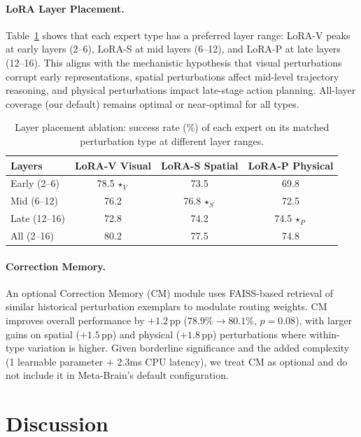 \documentclass[10pt,twocolumn]{article}
\newcommand{\ours}{Meta-Brain}
\newcommand{\pp}{\,\text{pp}}
\begin{document}
\paragraph{LoRA Layer Placement.}
Table~\ref{tab:layer_placement} shows that each expert type has a preferred layer range: LoRA-V peaks at early layers (2--6), LoRA-S at mid layers (6--12), and LoRA-P at late layers (12--16).
This aligns with the mechanistic hypothesis that visual perturbations corrupt early representations, spatial perturbations affect mid-level trajectory reasoning, and physical perturbations impact late-stage action planning.
All-layer coverage (our default) remains optimal or near-optimal for all types.

\begin{table}[t]
\centering
\caption{Layer placement ablation: success rate (\%) of each expert on its matched perturbation type at different layer ranges.}
\label{tab:layer_placement}
\small
\begin{tabular}{@{}lccc@{}}
\toprule
Layers & LoRA-V Visual & LoRA-S Spatial & LoRA-P Physical \\
\midrule
Early (2--6) & 78.5\,$\star_V$ & 73.5 & 69.8 \\
Mid (6--12) & 76.2 & 76.8\,$\star_S$ & 72.5 \\
Late (12--16) & 72.8 & 74.2 & 74.5\,$\star_P$ \\
All (2--16) & 80.2 & 77.5 & 74.8 \\
\bottomrule
\end{tabular}
\end{table}

\paragraph{Correction Memory.}
An optional Correction Memory (CM) module uses FAISS-based retrieval of similar historical perturbation exemplars to modulate routing weights.
CM improves overall performance by $+1.2\pp$ ($78.9\% \to 80.1\%$, $p{=}0.08$), with larger gains on spatial ($+1.5\pp$) and physical ($+1.8\pp$) perturbations where within-type variation is higher.
Given borderline significance and the added complexity (1 learnable parameter $+$ 2.3ms CPU latency), we treat CM as optional and do not include it in \ours{}'s default configuration.


\section{Discussion}
\label{sec:discussion}
\end{document}
